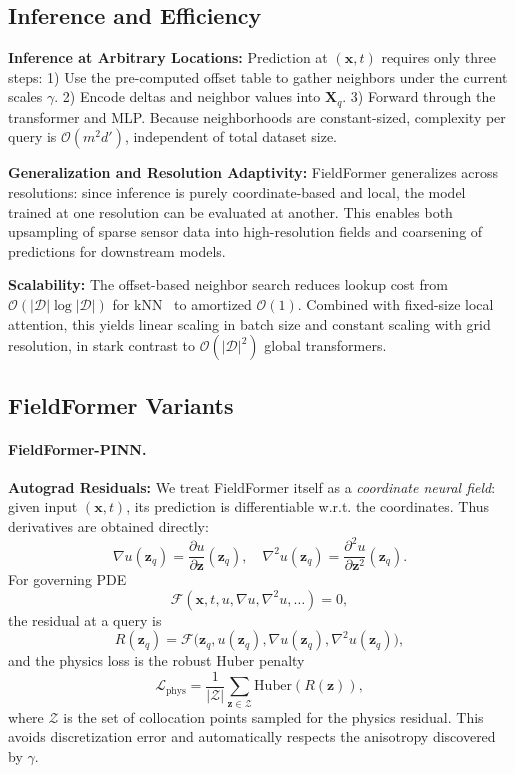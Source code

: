\subsection{Inference and Efficiency}
\label{sec:inference_and_efficiency}
\noindent\textbf{Inference at Arbitrary Locations:}  
Prediction at $(\mathbf{x},t)$ requires only three steps:  
1) Use the pre-computed offset table to gather neighbors under the current scales $\gamma$.  
2) Encode deltas and neighbor values into $\mathbf{X}_q$.
3) Forward through the transformer and MLP. Because neighborhoods are constant-sized, complexity per query is $\mathcal{O}(m^2 d')$, independent of total dataset size.

\noindent\textbf{Generalization and Resolution Adaptivity:}  
FieldFormer generalizes across resolutions: since inference is purely coordinate-based and local, the model trained at one resolution can be evaluated at another. This enables both upsampling of sparse sensor data into high-resolution fields and coarsening of predictions for downstream models.

\noindent\textbf{Scalability:}  
The offset-based neighbor search reduces lookup cost from $\mathcal{O}(|\mathcal{D}| \log |\mathcal{D}|)$ for kNN~\citep{bentley1975multidimensional} to amortized $\mathcal{O}(1)$. Combined with fixed-size local attention, this yields linear scaling in batch size and constant scaling with grid resolution, in stark contrast to $\mathcal{O}(|\mathcal{D}|^2)$ global transformers.

\subsection{FieldFormer Variants}
\label{sec:ff_variants}
\paragraph{FieldFormer-PINN.}
\noindent\textbf{Autograd Residuals:}  
We treat FieldFormer itself as a \emph{coordinate neural field}: given input $(\mathbf{x},t)$, its prediction is differentiable w.r.t. the coordinates. Thus derivatives are obtained directly:
\[
\nabla u(\mathbf{z}_q) = \frac{\partial u}{\partial \mathbf{z}}(\mathbf{z}_q), 
\quad 
\nabla^2 u(\mathbf{z}_q) = \frac{\partial^2 u}{\partial \mathbf{z}^2}(\mathbf{z}_q).
\]
For governing PDE
\[
\mathcal{F}(\mathbf{x},t,u,\nabla u, \nabla^2 u, \dots) = 0,
\]
the residual at a query is
\[
R(\mathbf{z}_q) = \mathcal{F}\big(\mathbf{z}_q, u(\mathbf{z}_q), \nabla u(\mathbf{z}_q), \nabla^2 u(\mathbf{z}_q)\big),
\]
and the physics loss is the robust Huber penalty
\[
\mathcal{L}_{\text{phys}} = \frac{1}{|\mathcal{Z}|} \sum_{\mathbf{z}\in\mathcal{Z}} \text{Huber}(R(\mathbf{z})),
\]
where $\mathcal{Z}$ is the set of collocation points sampled for the physics residual. This avoids discretization error and automatically respects the anisotropy discovered by $\gamma$.

